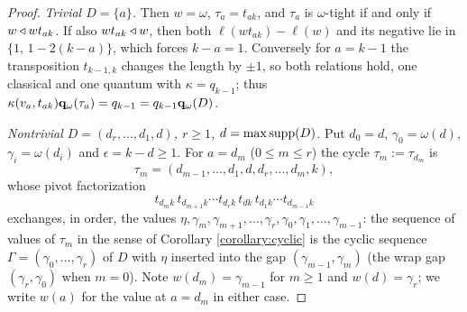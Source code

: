\documentclass{amsart}
\theoremstyle{definition}
\theoremstyle{remark}
\numberwithin{equation}{section}
\begin{document}
\begin{proof}
\emph{Trivial $D=\{a\}$.} Then $w=\omega$, $\tau_a=t_{ak}$, and $\tau_a$ is $\omega$-tight if and only if $w\triangleleft wt_{ak}$. If also $wt_{ak}\triangleleft w$, then both $\ell(wt_{ak})-\ell(w)$ and its negative lie in $\{1,\,1-2(k-a)\}$, which forces $k-a=1$. Conversely for $a=k-1$ the transposition $t_{k-1,k}$ changes the length by $\pm1$, so both relations hold, one classical and one quantum with $\kappa=q_{k-1}$; thus $\kappa(v_a,t_{ak})\mathbf{q}_\omega(\tau_a)=q_{k-1}=q_{k-1}\mathbf{q}_\omega(D)$.

\emph{Nontrivial $D=(d_r,\ldots,d_1,d)$, $r\geq1$, $d=\max\mathrm{supp}(D)$.} Put $d_0=d$, $\gamma_0=\omega(d)$, $\gamma_i=\omega(d_i)$ and $\epsilon=k-d\geq1$. For $a=d_m$ ($0\leq m\leq r$) the cycle $\tau_m:=\tau_{d_m}$ is
$$\tau_m=(d_{m-1},\ldots,d_1,d,d_r,\ldots,d_m,k),$$
whose pivot factorization
$$t_{d_mk}\,t_{d_{m+1}k}\cdots t_{d_rk}\,t_{dk}\,t_{d_1k}\cdots t_{d_{m-1}k}$$
exchanges, in order, the values $\eta,\gamma_m,\gamma_{m+1},\ldots,\gamma_r,\gamma_0,\gamma_1,\ldots,\gamma_{m-1}$: the sequence of values of $\tau_m$ in the sense of Corollary \ref{corollary:cyclic} is the cyclic sequence $\Gamma=(\gamma_0,\ldots,\gamma_r)$ of $D$ with $\eta$ inserted into the gap $(\gamma_{m-1},\gamma_m)$ (the wrap gap $(\gamma_r,\gamma_0)$ when $m=0$). Note $w(d_m)=\gamma_{m-1}$ for $m\geq1$ and $w(d)=\gamma_r$; we write $w(a)$ for the value at $a=d_m$ in either case.


\end{proof}
\end{document}
